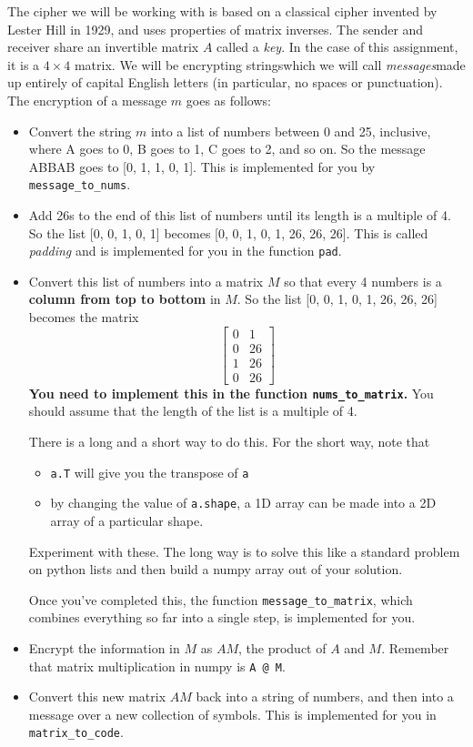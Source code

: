 \documentclass{article}
\theoremstyle{remark}
\begin{document}
The cipher we will be working with is based on a classical cipher invented by Lester Hill in 1929, and uses properties of matrix inverses.
The sender and receiver share an invertible matrix $A$ called a \textit{key}.
In the case of this assignment, it is a $4 \times 4$ matrix.
We will be encrypting strings\textemdash which we will call \textit{messages}\textemdash made up entirely of capital English letters (in particular, no spaces or punctuation).
The encryption of a message $m$ goes as follows:
\begin{itemize}
\item Convert the string $m$ into a list of numbers between 0 and 25, inclusive, where A goes to 0, B goes to 1, C goes to 2, and so on.
  So the message ABBAB goes to [0, 1, 1, 0, 1].
  This is implemented for you by \texttt{message\_to\_nums}.
\item Add 26s to the end of this list of numbers until its length is a multiple of 4.
  So the list [0, 0, 1, 0, 1] becomes [0, 0, 1, 0, 1, 26, 26, 26].
  This is called \textit{padding} and is implemented for you in the function \texttt{pad}.
\item Convert this list of numbers into a matrix $M$ so that every 4 numbers is a \textbf{column from top to bottom} in $M$.
  So the list [0, 0, 1, 0, 1, 26, 26, 26] becomes the matrix
  \begin{displaymath}
    \begin{bmatrix}
      0 & 1 \\
      0 & 26 \\
      1 & 26 \\
      0 & 26
    \end{bmatrix}
  \end{displaymath}
  \textbf{You need to implement this in the function \texttt{nums\_to\_matrix}.}
  You should assume that the length of the list is a multiple of 4.

  There is a long and a short way to do this.
  For the short way, note that
  \begin{itemize}
  \item
    \texttt{a.T} will give you the transpose of \texttt{a}
  \item
    by changing the value of \texttt{a.shape}, a 1D array can be made into a 2D array of a particular shape.
  \end{itemize}
  Experiment with these.
  The long way is to solve this like a standard problem on python lists and then build a numpy array out of your solution.

  Once you've completed this, the function \texttt{message\_to\_matrix}, which combines everything so far into a single step, is implemented for you.
\item Encrypt the information in $M$ as $AM$, the product of $A$ and $M$.
  Remember that matrix multiplication in numpy is \texttt{A @ M}.
\item Convert this new matrix $AM$ back into a string of numbers, and then into a message over a new collection of symbols.
  This is implemented for you in \texttt{matrix\_to\_code}.
\end{itemize}
\end{document}
